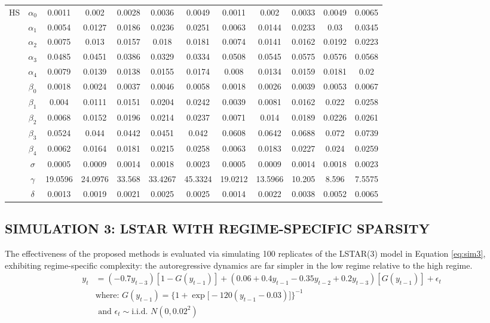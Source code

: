 \begin{table}[!h]
\begin{tabular}{cc|ccccc|ccccc}
    \midrule
    HS & $\alpha_0$ & 0.0011 & 0.002 & 0.0028 & 0.0036 & 0.0049 & 0.0011 & 0.002 & 0.0033 & 0.0049 & 0.0065 \\
    & $\alpha_1$ & 0.0054 & 0.0127 & 0.0186 & 0.0236 & 0.0251 & 0.0063 & 0.0144 & 0.0233 & 0.03 & 0.0345 \\
    & $\alpha_2$ & 0.0075 & 0.013 & 0.0157 & 0.018 & 0.0181 & 0.0074 & 0.0141 & 0.0162 & 0.0192 & 0.0223 \\
    & $\alpha_3$ & 0.0485 & 0.0451 & 0.0386 & 0.0329 & 0.0334 & 0.0508 & 0.0545 & 0.0575 & 0.0576 & 0.0568 \\
   & $\alpha_4$ & 0.0079 & 0.0139 & 0.0138 & 0.0155 & 0.0174 & 0.008 & 0.0134 & 0.0159 & 0.0181 & 0.02 \\
    & $\beta_0$ & 0.0018 & 0.0024 & 0.0037 & 0.0046 & 0.0058 & 0.0018 & 0.0026 & 0.0039 & 0.0053 & 0.0067 \\
    & $\beta_1$ & 0.004 & 0.0111 & 0.0151 & 0.0204 & 0.0242 & 0.0039 & 0.0081 & 0.0162 & 0.022 & 0.0258 \\
    & $\beta_2$ & 0.0068 & 0.0152 & 0.0196 & 0.0214 & 0.0237 & 0.0071 & 0.014 & 0.0189 & 0.0226 & 0.0261 \\
   & $\beta_3$ & 0.0524 & 0.044 & 0.0442 & 0.0451 & 0.042 & 0.0608 & 0.0642 & 0.0688 & 0.072 & 0.0739 \\
    & $\beta_4$ & 0.0062 & 0.0164 & 0.0181 & 0.0215 & 0.0258 & 0.0063 & 0.0183 & 0.0227 & 0.024 & 0.0259 \\
    & $\sigma$ & 0.0005 & 0.0009 & 0.0014 & 0.0018 & 0.0023 & 0.0005 & 0.0009 & 0.0014 & 0.0018 & 0.0023 \\
   & $\gamma$ & 19.0596 & 24.0976 & 33.568 & 33.4267 & 45.3324 & 19.0212 & 13.5966 & 10.205 & 8.596 & 7.5575 \\
   & $\delta$ & 0.0013 & 0.0019 & 0.0021 & 0.0025 & 0.0025 & 0.0014 & 0.0022 & 0.0038 & 0.0052 & 0.0065 \\
    \bottomrule
    \end{tabular}%
  \label{tab:changingsigma}%
\end{table}%

\subsection{SIMULATION 3: LSTAR WITH REGIME-SPECIFIC SPARSITY}

The effectiveness of the proposed methods is evaluated via simulating 100 replicates of the LSTAR(3) model in Equation \ref{eq:sim3}, exhibiting regime-specific complexity: the autoregressive dynamics are far simpler in the low regime relative to the high regime.
 \begin{equation}
	\begin{split}
		\label{eq:sim3}
		y_t&=(-0.7y_{t-3})[1-G(y_{t-1})] +(0.06+0.4y_{t-1}-0.35y_{t-2}+0.2y_{t-3})[G(y_{t-1})]+\epsilon_t\\
		& \textrm{where: } G(y_{t-1})=\bigg\{1+\exp\big[-120(y_{t-1}-0.03)\big]\bigg\}^{-1} \\
		&\textrm{ and }\epsilon_t \sim \textrm{i.i.d. }  N (0,0.02^2)\\
	\end{split}
\end{equation}

